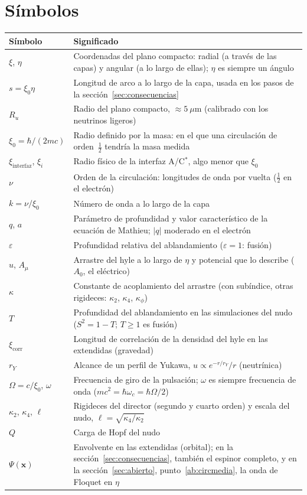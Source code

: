 \documentclass[11pt,a4paper]{article}
\newcommand{\Cst}{C\ensuremath{^{*}}}
\newcommand{\vb}[1]{\symbf{#1}}
\begin{document}
\section*{Símbolos}
\begin{center}
\small
\begin{tabularx}{\textwidth}{@{}l Y@{}}
\toprule
Símbolo & Significado \\
\midrule
$\xi$, $\eta$ & Coordenadas del plano compacto: radial (a través de las capas) y angular (a lo largo de ellas); $\eta$ es siempre un ángulo \\
$s=\xi_0\eta$ & Longitud de arco a lo largo de la capa, usada en los pasos de la sección~\ref{sec:consecuencias} \\
$R_u$ & Radio del plano compacto, $\approx5~\mu$m (calibrado con los neutrinos ligeros) \\
$\xi_0=\hbar/(2mc)$ & Radio definido por la masa: en el que una circulación de orden~$\tfrac12$ tendría la masa medida \\
$\xi_{\mathrm{interfaz}}$, $\xi_i$ & Radio físico de la interfaz A/\Cst, algo menor que $\xi_0$ \\
$\nu$ & Orden de la circulación: longitudes de onda por vuelta ($\tfrac12$ en el electrón) \\
$k=\nu/\xi_0$ & Número de onda a lo largo de la capa \\
$q$, $a$ & Parámetro de profundidad y valor característico de la ecuación de Mathieu; $|q|$ moderado en el electrón \\
$\varepsilon$ & Profundidad relativa del ablandamiento ($\varepsilon=1$: fusión) \\
$u$, $A_\mu$ & Arrastre del hyle a lo largo de $\eta$ y potencial que lo describe ($A_0$, el eléctrico) \\
$\kappa$ & Constante de acoplamiento del arrastre (con subíndice, otras rigideces: $\kappa_2$, $\kappa_4$, $\kappa_\phi$) \\
$T$ & Profundidad del ablandamiento en las simulaciones del nudo ($S^2=1-T$; $T\ge1$ es fusión) \\
$\xi_{\mathrm{corr}}$ & Longitud de correlación de la densidad del hyle en las extendidas (gravedad) \\
$r_Y$ & Alcance de un perfil de Yukawa, $u\propto e^{-r/r_Y}/r$ (neutrínica) \\
$\Omega=c/\xi_0$, $\omega$ & Frecuencia de giro de la pulsación; $\omega$ es siempre frecuencia de onda ($mc^2=\hbar\omega_c=\hbar\Omega/2$) \\
$\kappa_2$, $\kappa_4$, $\ell$ & Rigideces del director (segundo y cuarto orden) y escala del nudo, $\ell=\sqrt{\kappa_4/\kappa_2}$ \\
$Q$ & Carga de Hopf del nudo \\
$\Psi(\vb{x})$ & Envolvente en las extendidas (orbital); en la sección~\ref{sec:consecuencias}, también el espinor completo, y en la sección~\ref{sec:abierto}, punto~\ref{ab:circmedia}, la onda de Floquet en $\eta$ \\
\bottomrule
\end{tabularx}
\end{center}
\end{document}

